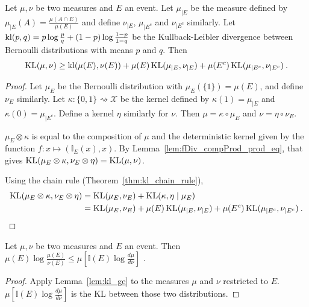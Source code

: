 \begin{lemma}
  \label{lem:kl_chain_rule_cond_event}
  Let $\mu, \nu$ be two measures and $E$ an event. Let $\mu_{|E}$ be the measure defined by $\mu_{|E}(A) = \frac{\mu(A \cap E)}{\mu(E)}$ and define $\nu_{|E}$, $\mu_{| E^c}$ and $\nu_{| E^c}$ similarly. Let $\operatorname{kl}(p,q) = p\log\frac{p}{q} + (1-p)\log\frac{1-p}{1-q}$ be the Kullback-Leibler divergence between Bernoulli distributions with means $p$ and $q$. Then
  \begin{align*}
  \operatorname{KL}(\mu, \nu) \ge \operatorname{kl}(\mu(E), \nu(E)) + \mu(E) \operatorname{KL}(\mu_{|E}, \nu_{|E}) + \mu(E^c) \operatorname{KL}(\mu_{|E^c}, \nu_{|E^c}) \: .
  \end{align*}
\end{lemma}

\begin{proof}
Let $\mu_E$ be the Bernoulli distribution with $\mu_E(\{1\}) = \mu(E)$, and define $\nu_E$ similarly.
Let $\kappa : \{0,1\} \rightsquigarrow \mathcal X$ be the kernel defined by $\kappa(1) = \mu_{|E}$ and $\kappa(0) = \mu_{|E^c}$. Define a kernel $\eta$ similarly for $\nu$.
Then $\mu = \kappa \circ \mu_E$ and $\nu = \eta \circ \nu_E$.

$\mu_E \otimes \kappa$ is equal to the composition of $\mu$ and the deterministic kernel given by the function $f : x \mapsto (\mathbb{I}_E(x), x)$. By Lemma~\ref{lem:fDiv_compProd_prod_eq}, that gives $\operatorname{KL}(\mu_E \otimes \kappa, \nu_E \otimes \eta) = \operatorname{KL}(\mu, \nu)$.

Using the chain rule (Theorem~\ref{thm:kl_chain_rule}),
\begin{align*}
\operatorname{KL}(\mu_E \otimes \kappa, \nu_E \otimes \eta)
&= \operatorname{KL}(\mu_E, \nu_E) + \operatorname{KL}(\kappa, \eta \mid \mu_E)
\\
&= \operatorname{KL}(\mu_E, \nu_E) + \mu(E) \operatorname{KL}(\mu_{|E}, \nu_{|E}) + \mu(E^c) \operatorname{KL}(\mu_{|E^c}, \nu_{|E^c})
\: .
\end{align*}

\end{proof}

\begin{lemma}
  \label{lem:expectation_llr_event}
  Let $\mu, \nu$ be two measures and $E$ an event. Then
  $\mu(E)\log\frac{\mu(E)}{\nu(E)} \le \mu\left[\mathbb{I}(E)\log \frac{d \mu}{d \nu}\right]$ .
\end{lemma}

\begin{proof}
Apply Lemma~\ref{lem:kl_ge} to the measures $\mu$ and $\nu$ restricted to $E$. $\mu\left[\mathbb{I}(E)\log \frac{d \mu}{d \nu}\right]$ is the KL between those two distributions.
\end{proof}